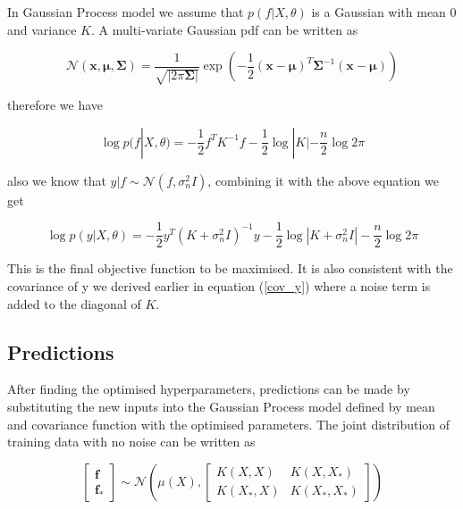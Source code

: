 \documentclass[14pt]{report}
\numberwithin{equation}{chapter}
\begin{document}
\begin{spacing}{2}
In Gaussian Process model we assume that $p(f|X,\theta)$ is a Gaussian with mean 0 and variance $K$. A multi-variate Gaussian pdf can be written as 

\[\mathcal{N}(\mathbf{x},\mathbf{\mu},\mathbf{\Sigma}) = \frac{1}{\sqrt{|2\pi\mathbf{\Sigma}|}}\operatorname{exp}\left(-\frac{1}{2}(\mathbf{x} - \mathbf{\mu})^T\mathbf{\Sigma}^{-1}(\mathbf{x} - \mathbf{\mu})\right)\]

therefore we have

\begin{equation}
\label{f_posterior}
\operatorname{log}p(f|X,\theta) = -\frac{1}{2}f^TK^{-1}f-\frac{1}{2}\operatorname{log}|K| - \frac{n}{2}\operatorname{log}2\pi
\end{equation}

also we know that $y|f\sim \mathcal{N}\left(f,\sigma_n^2 I\right)$, combining it with the above equation we get

\begin{equation}
\operatorname{log}p(y|X,\theta) = -\frac{1}{2}y^T(K+\sigma_n^2 I)^{-1}y - \frac{1}{2}\operatorname{log}\left|K+\sigma_n^2 I\right|- \frac{n}{2}\operatorname{log}2\pi
\end{equation}

This is the final objective function to be maximised. It is also consistent with the covariance of y we derived earlier in equation (\ref{cov_y}) where a noise term is added to the diagonal of $K$.


\subsection{Predictions}
After finding the optimised hyperparameters, predictions can be made by substituting the new inputs into the Gaussian Process model defined by mean and covariance function with the optimised parameters. The joint distribution of training data with no noise can be written as 

\begin{equation}
\left[\begin{array}{c} 
\mathbf{f} \\
\mathbf{f}_\ast \end{array}
 \right] \sim \mathcal{N} 
 \left(\mu(X), \left[\begin{array}{cc}
 K(X, X) & K(X, X_\ast)\\
 K(X_\ast, X) & K(X_\ast, X_\ast)
 \end{array}\right]\right)
\end{equation} 


\end{spacing}
\end{document}
